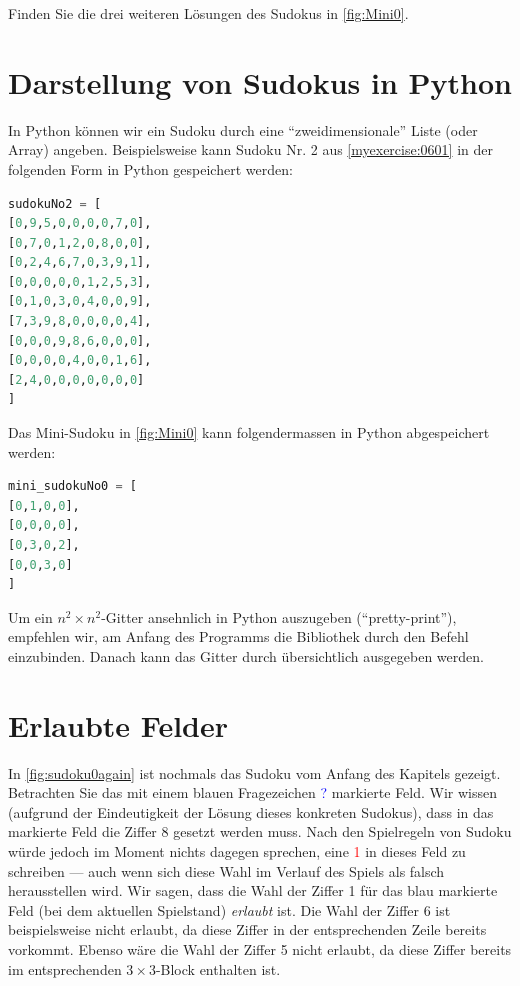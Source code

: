 \begin{myexercise}\label{myexercise:0677}
	Finden Sie die drei weiteren Lösungen des Sudokus in \cref{fig:Mini0}.
\end{myexercise}

\section{Darstellung von Sudokus in Python}
In Python können wir ein Sudoku durch eine \enquote{zweidimensionale} Liste (oder Array) angeben. Beispielsweise kann Sudoku Nr. 2 aus \cref{myexercise:0601} in der folgenden Form in Python gespeichert werden:
\begin{lstlisting}[language=Python,caption=Abspeichern von Sudoku-Gittern in Python,numbers=none]
sudokuNo2 = [
[0,9,5,0,0,0,0,7,0],
[0,7,0,1,2,0,8,0,0],
[0,2,4,6,7,0,3,9,1],
[0,0,0,0,0,1,2,5,3],
[0,1,0,3,0,4,0,0,9],
[7,3,9,8,0,0,0,0,4],
[0,0,0,9,8,6,0,0,0],
[0,0,0,0,4,0,0,1,6],
[2,4,0,0,0,0,0,0,0]
]
\end{lstlisting}
Das Mini-Sudoku in \cref{fig:Mini0} kann folgendermassen in Python abgespeichert werden:
\begin{lstlisting}[language=Python,caption=Abspeichern von Mini-Sudoku-Gittern in Python,numbers=none]
mini_sudokuNo0 = [
[0,1,0,0],
[0,0,0,0],
[0,3,0,2],
[0,0,3,0]
]
\end{lstlisting}
Um ein $n^2\times n^2$-Gitter ansehnlich in Python auszugeben (\enquote{pretty-print}), empfehlen wir, am Anfang des Programms die Bibliothek  durch den Befehl  einzubinden. Danach kann das Gitter durch  übersichtlich ausgegeben werden.

\section{Erlaubte Felder}
In \cref{fig:sudoku0again} ist nochmals das Sudoku vom Anfang des Kapitels gezeigt. Betrachten Sie das mit einem blauen Fragezeichen \textcolor{Blue}{?} markierte Feld. Wir wissen (aufgrund der Eindeutigkeit der Lösung dieses konkreten Sudokus), dass in das markierte Feld die Ziffer 8 gesetzt werden muss. Nach den Spielregeln von Sudoku würde jedoch im Moment nichts dagegen sprechen, eine \textcolor{Red}{1} in dieses Feld zu schreiben --- auch wenn sich diese Wahl im Verlauf des Spiels als falsch herausstellen wird. Wir sagen, dass die Wahl der Ziffer 1 für das blau markierte Feld (bei dem aktuellen Spielstand) \textit{erlaubt} ist. Die Wahl der Ziffer 6 ist beispielsweise nicht erlaubt, da diese Ziffer in der entsprechenden Zeile bereits vorkommt. Ebenso wäre die Wahl der Ziffer 5 nicht erlaubt, da diese Ziffer bereits im entsprechenden $3\times 3$-Block enthalten ist.

